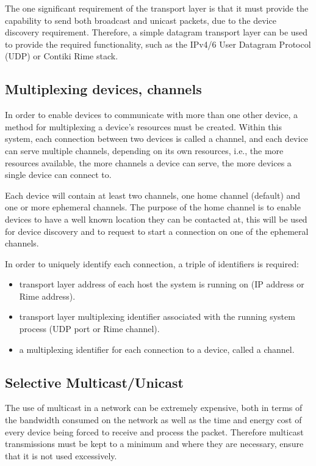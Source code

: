 The one significant requirement of the transport layer is that it must provide the capability to send both broadcast and unicast packets, due to the device discovery requirement.
Therefore, a simple datagram transport layer can be used to provide the required functionality, such as the IPv4/6 User Datagram Protocol (UDP) or Contiki Rime stack\cite{RimeStack}.

\subsection{Multiplexing devices, channels}
In order to enable devices to communicate with more than one other device, a method for multiplexing a device's resources must be created. Within this system, each connection between two devices is called a channel, and each device can serve multiple channels, depending on its own resources, i.e., the more resources available, the more channels a device can serve, the more devices a single device can connect to. 

Each device will contain at least two channels, one home channel (default) and one or more ephemeral channels. The purpose of the home channel is to enable devices to have a well known location they can be contacted at, this will be used for device discovery and to request to start a connection on one of the ephemeral channels.

In order to uniquely identify each connection, a triple of identifiers is required:
\begin{itemize}
	\item transport layer address of each host the system is running on (IP address or Rime address).
	\item transport layer multiplexing identifier associated with the running system process (UDP port or Rime channel).
	\item a multiplexing identifier for each connection to a device, called a channel.
\end{itemize}

\subsection{Selective Multicast/Unicast} %
\label{sub:selective_multicast_unicast}
The use of multicast in a network can be extremely expensive, both in terms of the bandwidth consumed on the network as well as the time and energy cost of every device being forced to receive and process the packet. Therefore multicast transmissions must be kept to a minimum and where they are necessary, ensure that it is not used excessively.

